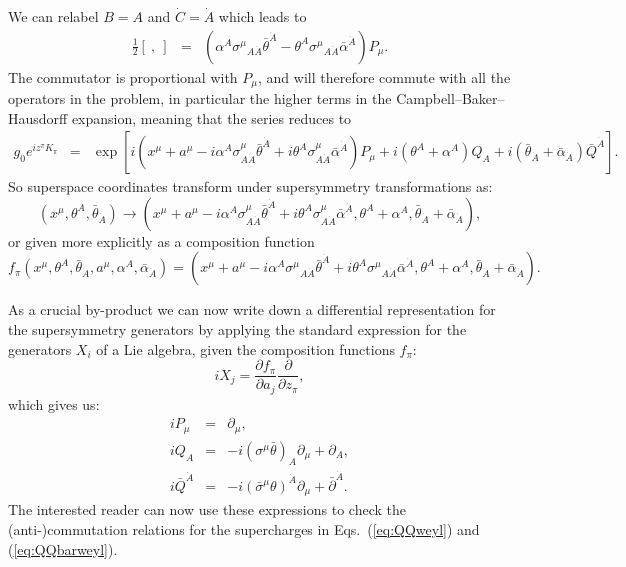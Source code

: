 \documentclass[notes.tex]{subfiles}
\begin{document}
We can relabel $B = A$ and $\dot{C} = \dot{A}$ which leads to 
\begin{eqnarray*}
\frac{1}{2}[~,~]&=&(\alpha^A\sigma^\mu{}_{A\dot{A}}\bar{\theta}^{\dot{A}} -\theta^A\sigma^\mu{}_{A\dot{A}}\bar{\alpha}^{\dot{A}})P_\mu.
\end{eqnarray*}
The commutator is proportional with $P_\mu$, and will therefore commute with all the operators in the problem, in particular the higher terms in the Campbell--Baker--Hausdorff expansion, meaning that the series reduces to
\begin{eqnarray*}
g_0 e^{iz^\pi K_\pi} 
&=& \exp[i(x^\mu + a^\mu - i\alpha^A\sigma^\mu_{A\dot{A}}\bar{\theta}^{\dot{A}} + i\theta^A\sigma^\mu_{A\dot{A}}\bar{\alpha}^{\dot{A}})P_\mu + i(\theta^A+\alpha^A)Q_A + i(\bar{\theta}_{\dot{A}}+\bar{\alpha}_{\dot{A}})\bar{Q}^{\dot{A}}].
\end{eqnarray*}
So superspace coordinates transform under supersymmetry transformations as:
\begin{equation}
(x^\mu, \theta^A, \bar{\theta}_{\dot{A}}) \to  (x^\mu + a^\mu -i\alpha^A\sigma^\mu_{A\dot{A}}\bar{\theta}^{\dot{A}} + i\theta^A\sigma^\mu_{A\dot{A}}\bar{\alpha}^{\dot{A}}, \theta^A + \alpha^A, \bar{\theta}_{\dot{A}} + \bar{\alpha}_{\dot{A}}),
\end{equation}
or given more explicitly as a composition function
\begin{equation}
f_\pi(x^\mu, \theta^A, \bar{\theta}_{\dot{A}},a^\mu, \alpha^A, \bar{\alpha}_{\dot{A}}) =  (x^\mu + a^\mu -i\alpha^A\sigma^\mu{}_{A\dot{A}}\bar{\theta}^{\dot{A}} + i\theta^A\sigma^\mu{}_{A\dot{A}}\bar{\alpha}^{\dot{A}}, \theta^A + \alpha^A, \bar{\theta}_{\dot{A}} + \bar{\alpha}_{\dot{A}}).
\end{equation}

As a crucial by-product we can now write down a differential representation for the supersymmetry generators by applying the standard expression for the generators $X_i$ of a Lie algebra, given the composition functions $f_\pi$:
\[ iX_j = \frac{\partial f_\pi}{\partial a_j}\frac{\partial}{\partial z_\pi},\]
which gives us:
\begin{eqnarray}
iP_\mu &=& \partial_\mu \label{eq:diffrepP},\\
iQ_A &=& -i(\sigma^\mu\bar{\theta})_A\partial_\mu +\partial_A,\label{eq:diffrepQ} \\
i\bar{Q}^{\dot{A}} &=& -i(\bar{\sigma}^\mu \theta)^{\dot{A}}\partial_\mu +\bar\partial^{\dot{A}}.
\label{eq:diffrepQbar}
\end{eqnarray}
The interested reader can now use these expressions to check the (anti-)commutation relations for the supercharges in Eqs.~(\ref{eq:QQweyl}) and (\ref{eq:QQbarweyl}).
\end{document}
